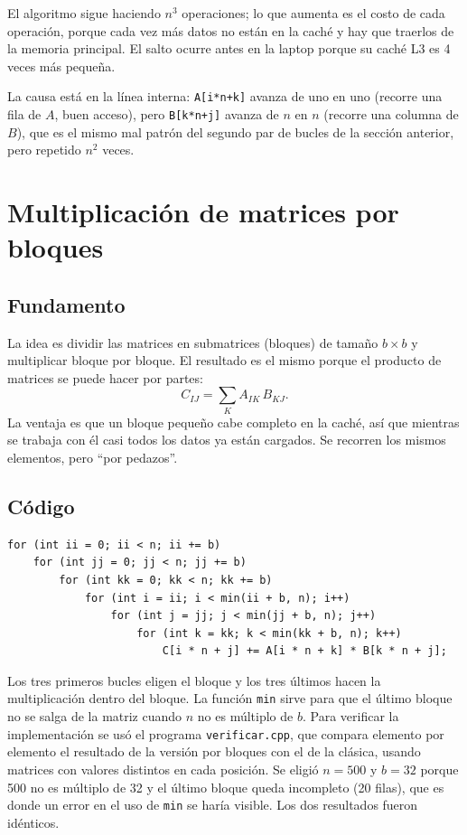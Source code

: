 \documentclass[11pt]{article}
\begin{document}
El algoritmo sigue haciendo $n^3$ operaciones; lo que aumenta es el costo
de cada operación, porque cada vez más datos no están en la caché y hay que
traerlos de la memoria principal. El salto ocurre antes en la laptop porque
su caché L3 es 4 veces más pequeña.

La causa está en la línea interna: \texttt{A[i*n+k]} avanza de uno en uno
(recorre una fila de $A$, buen acceso), pero \texttt{B[k*n+j]} avanza de
$n$ en $n$ (recorre una columna de $B$), que es el mismo mal patrón del
segundo par de bucles de la sección anterior, pero repetido $n^2$ veces.

\section{Multiplicación de matrices por bloques}

\subsection{Fundamento}

La idea es dividir las matrices en submatrices (bloques) de tamaño
$b \times b$ y multiplicar bloque por bloque. El resultado es el mismo
porque el producto de matrices se puede hacer por partes:
\[
C_{IJ} = \sum_{K} A_{IK} \, B_{KJ}.
\]
La ventaja es que un bloque pequeño cabe completo en la caché, así que
mientras se trabaja con él casi todos los datos ya están cargados. Se
recorren los mismos elementos, pero ``por pedazos''.

\subsection{Código}

\begin{lstlisting}[caption={Multiplicación por bloques con seis bucles (\texttt{bloques.cpp}).}]
for (int ii = 0; ii < n; ii += b)
    for (int jj = 0; jj < n; jj += b)
        for (int kk = 0; kk < n; kk += b)
            for (int i = ii; i < min(ii + b, n); i++)
                for (int j = jj; j < min(jj + b, n); j++)
                    for (int k = kk; k < min(kk + b, n); k++)
                        C[i * n + j] += A[i * n + k] * B[k * n + j];
\end{lstlisting}

Los tres primeros bucles eligen el bloque y los tres últimos hacen la
multiplicación dentro del bloque. La función \texttt{min} sirve para que el
último bloque no se salga de la matriz cuando $n$ no es múltiplo de $b$.
Para verificar la implementación se usó el programa \texttt{verificar.cpp},
que compara elemento por elemento el resultado de la versión por bloques con
el de la clásica, usando matrices con valores distintos en cada posición. Se
eligió $n=500$ y $b=32$ porque 500 no es múltiplo de 32 y el último bloque
queda incompleto (20 filas), que es donde un error en el uso de \texttt{min}
se haría visible. Los dos resultados fueron idénticos.
\end{document}
